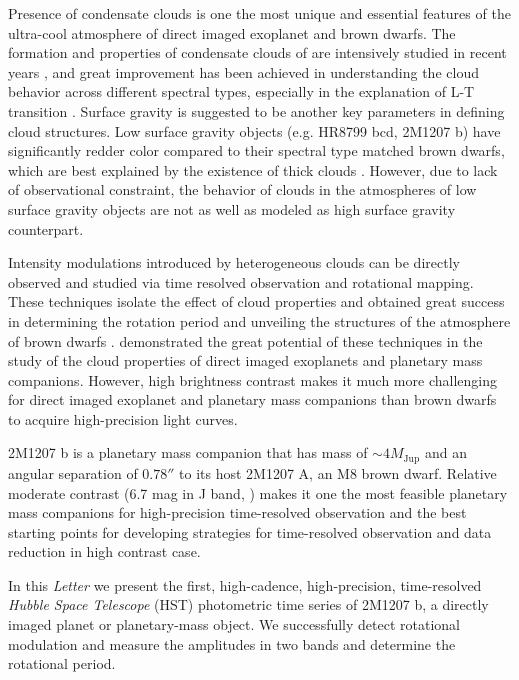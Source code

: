 \documentclass[apj]{emulateapj}
\begin{document}
Presence of condensate clouds is one the most unique and essential
features of the ultra-cool atmosphere of direct imaged exoplanet and brown
dwarfs. The formation and properties of condensate clouds of are
intensively studied in recent years \citep[e.g.][]{Ackerman2001,
  Helling2008, Allard2012}, and great improvement has been
achieved in understanding the cloud behavior across different spectral
types, especially in the explanation of L-T transition \citep{Marley2010}.
Surface gravity is suggested to be another key parameters 
in defining cloud structures. Low surface gravity objects (e.g. HR8799 bcd, 2M1207
b) have significantly redder color compared to their spectral type
matched brown dwarfs, which are best explained by the existence of 
thick clouds \citep{Barman2011, Skemer2011, Skemer2012}. However, due to lack of observational constraint, the
behavior of clouds in the atmospheres of low surface gravity objects
are not as well as modeled as high surface gravity counterpart.

Intensity modulations introduced by heterogeneous clouds can be
directly observed and studied via time resolved observation and
rotational mapping. These techniques isolate the effect of cloud
properties and obtained great success in determining the rotation
period and unveiling the structures of the atmosphere of brown dwarfs
\citep[e.g.][]{Apai2013,Buenzli2012,Buenzli2015,Burgasser2013,Radigan2012,Yang2014,Metchev2015}. \cite{Kostov2013}
demonstrated the great potential of these techniques in the study of the cloud properties of
direct imaged exoplanets and planetary mass companions. However, high
brightness contrast makes it much more challenging for direct
imaged exoplanet and planetary mass companions than brown
dwarfs to acquire high-precision light curves.

2M1207 b \citep{Chauvin2005} is a planetary mass companion that has mass of
$\sim 4M_{\mathrm{Jup}}$ and an angular separation of $0.78''$ to its host
2M1207 A,
an M8 brown dwarf. Relative moderate contrast (6.7 mag in J band, \cite{Mohanty2007}) makes it one
the most feasible planetary mass companions for high-precision
time-resolved observation and the best starting points for developing
strategies for time-resolved observation and data reduction in high
contrast case.

In this {\em Letter} we present the first, high-cadence, high-precision,
time-resolved {\em Hubble Space Telescope} (HST) photometric time
series of 2M1207 b, a directly imaged planet or
planetary-mass object. We successfully detect rotational modulation
and measure the amplitudes in two bands and determine the rotational
period.
\end{document}
